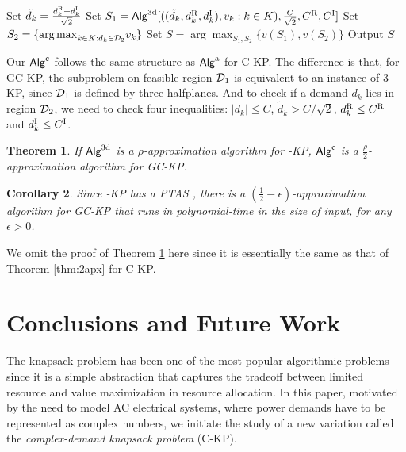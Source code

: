 \documentclass{aamas2013}
\newtheorem{theorem}{Theorem}[section]
\newtheorem{corollary}[theorem]{Corollary}
\begin{document}
\begin{algorithm}[htb!]
\caption{${\sf Alg}^{\rm c} [(d_k,v_k: k \in K), C, C^{\rm R}, C^{\rm I}]$}
\begin{algorithmic}[1]
\STATE Set $\tilde{d}_k = \frac{d_k^{\rm R}+d_k^{\rm I}}{\sqrt{2}}$
\ENDFOR
\STATE Set $S_1 = {\sf Alg}^{\rm 3d}[((\tilde{d}_k, d_k^{\rm R}, d_k^{\rm I}),v_k: k \in K),\frac{C}{\sqrt{2}}, C^{\rm R}, C^{\rm I}]$
\STATE Set $S_2 = \{\displaystyle {\arg\max}_{k \in K : d_k \in {\cal D}_2  } v_k \}$
\STATE Set $S = \arg\max_{S_1, S_2}\{ v(S_1), v(S_2) \}$
\STATE Output $S$
\end{algorithmic} 
\end{algorithm} 

Our ${\sf Alg}^{\rm c}$ follows the same structure as ${\sf Alg}^{\rm a}$ for C-KP.  The difference is that, for GC-KP, the subproblem on feasible region ${\cal D}_1$ is equivalent to an instance of 3-KP, since ${\cal D}_1$ is defined by three halfplanes.  And to check if a demand $d_k$ lies in region ${\cal D}_2$, we need to check four inequalities: $|d_k|\leq C$, $\tilde{d}_k> C/\sqrt{2}$, $d_k^{\rm R}\leq C^{\rm R}$ and $d_k^{\rm I}\leq C^{\rm I}$. 

\begin{theorem} 
\label{thm:g2apx}
If ${\sf Alg}^{\rm 3d}$ is a $\rho$-approximation algorithm for {-KP},  ${\sf Alg}^{\rm c}$ is a $\frac{\rho}{2}$-approximation algorithm for {\sc GC-KP}.
\end{theorem}

\begin{corollary}
\label{cor:g2apx}
Since {-KP} has a PTAS \cite{FC84alg}, there is a $(\frac{1}{2}-\epsilon)$-approximation algorithm for {\sc GC-KP} that runs in polynomial-time in the size of input, for any $\epsilon>0$.
\end{corollary}  


We omit the proof of Theorem \ref{thm:g2apx} here since it is essentially the same as that of Theorem \ref{thm:2apx} for C-KP.  


\section{Conclusions and Future Work}\label{sec:conc}
\noindent
The knapsack problem has been one of the most popular algorithmic problems since it is a simple abstraction that captures the tradeoff between limited resource and value maximization in resource allocation.  In this paper, motivated by the need to model AC electrical systems, where power demands have to be represented as complex numbers, we initiate the study of a new variation called the {\em complex-demand knapsack problem} (C-KP).  
\end{document}
